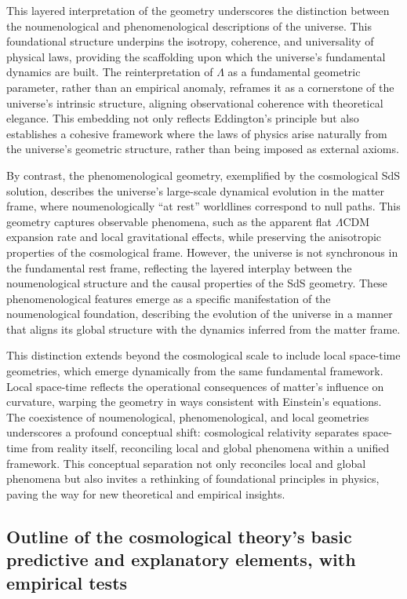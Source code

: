 \documentclass[aps,rmp,groupedaddress,twocolumn,10pt]{revtex4-2}
\begin{document}
This layered interpretation of the geometry underscores the distinction between the noumenological and phenomenological descriptions of the universe. This foundational structure underpins the isotropy, coherence, and universality of physical laws, providing the scaffolding upon which the universe's fundamental dynamics are built. The reinterpretation of $\Lambda$ as a fundamental geometric parameter, rather than an empirical anomaly, reframes it as a cornerstone of the universe's intrinsic structure, aligning observational coherence with theoretical elegance. This embedding not only reflects Eddington's principle but also establishes a cohesive framework where the laws of physics arise naturally from the universe's geometric structure, rather than being imposed as external axioms. 

By contrast, the phenomenological geometry, exemplified by the cosmological SdS solution, describes the universe's large-scale dynamical evolution in the matter frame, where noumenologically ``at rest'' worldlines correspond to null paths. This geometry captures observable phenomena, such as the apparent flat $\Lambda$CDM expansion rate and local gravitational effects, while preserving the anisotropic properties of the cosmological frame. However, the universe is not synchronous in the fundamental rest frame, reflecting the layered interplay between the noumenological structure and the causal properties of the SdS geometry. These phenomenological features emerge as a specific manifestation of the noumenological foundation, describing the evolution of the universe in a manner that aligns its global structure with the dynamics inferred from the matter frame.

This distinction extends beyond the cosmological scale to include local space-time geometries, which emerge dynamically from the same fundamental framework. Local space-time reflects the operational consequences of matter's influence on curvature, warping the geometry in ways consistent with Einstein's equations. The coexistence of noumenological, phenomenological, and local geometries underscores a profound conceptual shift: cosmological relativity separates space-time from reality itself, reconciling local and global phenomena within a unified framework. This conceptual separation not only reconciles local and global phenomena but also invites a rethinking of foundational principles in physics, paving the way for new theoretical and empirical insights.

\subsection{Outline of the cosmological theory's basic predictive and explanatory elements, with empirical tests}
\end{document}
